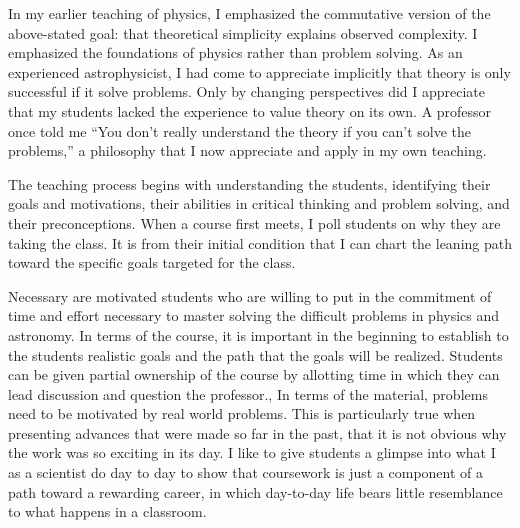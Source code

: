 \documentclass{article}
\begin{document}
In my earlier teaching of physics,  I emphasized the commutative version
of the above-stated goal: that theoretical simplicity explains observed complexity.  I  emphasized the foundations of physics
rather than problem solving. As an experienced astrophysicist, I had come to
appreciate implicitly that theory is only successful if it solve problems.  Only by changing perspectives
did I appreciate that my students lacked the experience
to value theory on its own.  A  professor once told me
``You don't really understand the theory if you can't solve the problems,'' a philosophy that I now  appreciate and
apply in my own teaching.


The teaching process  begins with understanding the students, identifying their goals and motivations, their abilities in critical thinking and
problem solving, and their preconceptions.  When a course first meets, I poll students on why they are taking the
class.  It is from their initial condition that I can chart the leaning path toward the specific goals targeted
for the class. 

Necessary are  motivated students who are willing to put in the commitment of time and effort
necessary to master solving the difficult problems in physics and astronomy.
In terms of the course,
it is important in the beginning to establish  to the students realistic goals and the path that the goals will be realized.
Students can be given partial ownership of the course by allotting time in which they can lead discussion and question the
professor.,
In terms of the material, problems need to be motivated by real world problems.
This is particularly true when presenting advances that were made so far in the past, that it is not obvious
why the work was so exciting in its day. 
I like to give students a glimpse into what I as a scientist do day to day to show that coursework
is just a component of a path toward a rewarding career, in which day-to-day life bears little resemblance to what
happens in a classroom.
\end{document}
